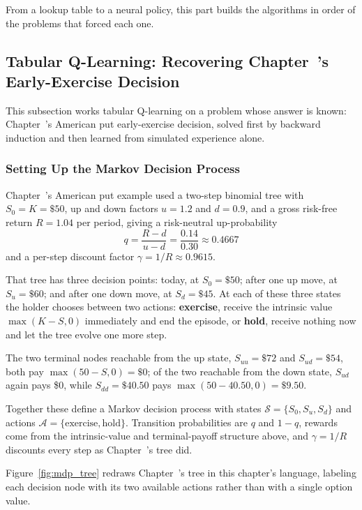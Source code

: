\documentclass[../ai_in_finance]{subfiles}
\begin{document}
From a lookup table to a neural policy, this part builds the algorithms in order of the problems that forced each one.

\subsection{Tabular Q-Learning: Recovering Chapter~'s Early-Exercise Decision}
\label{sec:rl-qlearning}

This subsection works tabular Q-learning on a problem whose answer is known: Chapter~'s American put early-exercise decision, solved first by backward induction and then learned from simulated experience alone.

\subsubsection*{Setting Up the Markov Decision Process}

Chapter~'s American put example used a two-step binomial tree with $S_0 = K = \$50$, up and down factors $u=1.2$ and $d=0.9$, and a gross risk-free return $R=1.04$ per period,
giving a risk-neutral up-probability
$$q = \frac{R-d}{u-d} = \frac{0.14}{0.30} \approx 0.4667$$
 and a per-step discount factor $\gamma = 1/R \approx 0.9615$.

That tree has three decision points: today, at $S_0=\$50$; after one up move, at $S_u=\$60$; and after one down move, at $S_d=\$45$. At each of these
three states the holder chooses between two actions: \textbf{exercise}, receive the intrinsic value $\max(K-S,0)$ immediately and end the episode, or
\textbf{hold}, receive nothing now and let the tree evolve one more step.

The two terminal nodes reachable from the up state, $S_{uu}=\$72$ and $S_{ud}=\$54$, both pay $\max(50-S,0)=\$0$; of the two reachable
from the down state, $S_{ud}$ again pays \$0, while $S_{dd}=\$40.50$ pays $\max(50-40.50,0)=\$9.50$.

Together these define a Markov decision process with states $\mathcal{S}=\{S_0, S_u, S_d\}$ and actions $\mathcal{A}=\{\text{exercise}, \text{hold}\}$. Transition probabilities are $q$ and $1-q$, rewards come from the intrinsic-value and terminal-payoff structure above, and $\gamma=1/R$ discounts every step as Chapter~'s tree did.

Figure~\ref{fig:mdp_tree} redraws Chapter~'s tree in this chapter's language, labeling each decision node with its two available actions rather than with a single option value.
\end{document}

